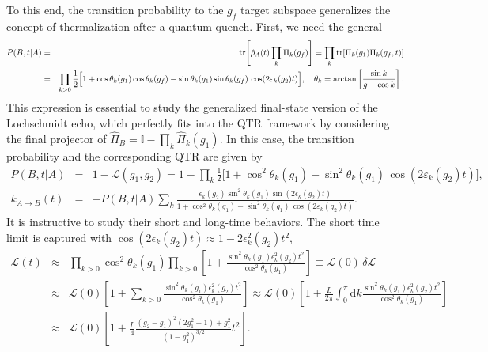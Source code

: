 \documentclass[prl,aps,amssymb,twocolumn,superscriptaddress, notitlepage, longbibliography]{revtex4-2}
\begin{document}
To this end, the transition probability to the $g_f$ target subspace generalizes the concept of thermalization after a quantum quench. First, we need the general
\begin{eqnarray}
    P(B,t\vert A)&=&\tr[\hat \rho_A(t)\prod_k\Pi_k(g_f)]=\prod_k\tr[\Pi_k(g_1)\Pi_k(g_f,t)]\\
    &=&\prod_{k>0} \frac{1}{2} \Big[ 1 + \cos \theta_k(g_1) \cos \theta_k(g_f) - \sin \theta_k(g_1) \sin\theta_k(g_f) \, \cos(2 \varepsilon_k(g_2) t) \Big],\quad\theta_k=\arctan\left[\frac{\sin k}{g-\cos k}\right].\nonumber
\end{eqnarray}
This expression is essential to study the generalized final-state version of the Lochschmidt echo, which perfectly fits into the QTR framework by considering the final projector of $\hat\Pi_B=\mathbb I-\prod_k\hat\Pi_k(g_1)$. In this case, the transition probability and the corresponding QTR are given by
\begin{eqnarray}
    P(B,t\vert A)&=&1-\mathcal L(g_1,g_2)=1-\prod_k\frac{1}{2}\Big[ 1 + \cos^2 \theta_k(g_1)  - \sin^2 \theta_k(g_1) \, \cos(2 \varepsilon_k(g_2) t) \Big],\\
    k_{A\rightarrow B}(t)&=&-P(B,t\vert A)\sum_k\frac{\epsilon_k(g_2)\sin^2\theta_k(g_1)\sin\left(2\epsilon_k(g_2)t\right)}{ 1 + \cos^2 \theta_k(g_1)  - \sin^2 \theta_k(g_1) \, \cos(2 \varepsilon_k(g_2) t)}.
\end{eqnarray}
It is instructive to study their short and long-time behaviors. The short time limit is captured with $\cos(2\epsilon_k(g_2)t)\approx1-2\epsilon^2_k(g_2)t^2$,
\begin{eqnarray}
\mathcal L(t)&\approx&\mathcal \prod_{k>0}\cos^2\theta_k(g_1)\prod_{k>0}\left[1+\frac{\sin^2\theta_k(g_1)\epsilon^2_k(g_2) t^2}{\cos^2\theta_k(g_1)}\right]\equiv\mathcal L(0)\,\delta\mathcal L\\
&\approx&\mathcal L(0)\left[1+\sum_{k>0}\frac{\sin^2\theta_k(g_1)\epsilon^2_k(g_2) t^2}{\cos^2\theta_k(g_1)}\right]\approx\mathcal L(0)\left[1+\frac{L}{2\pi}\int_0^\pi\mathrm dk\frac{\sin^2\theta_k(g_1)\epsilon^2_k(g_2) t^2}{\cos^2\theta_k(g_1)}\right]\nonumber\\
&\approx&\mathcal L(0)\left[1+\frac{L}{4}\frac{(g_2-g_1)^2(2g^2_1-1)+g^2_1}{(1-g^2_1)^{3/2}}t^2\right].\nonumber
\end{eqnarray}
\end{document}
